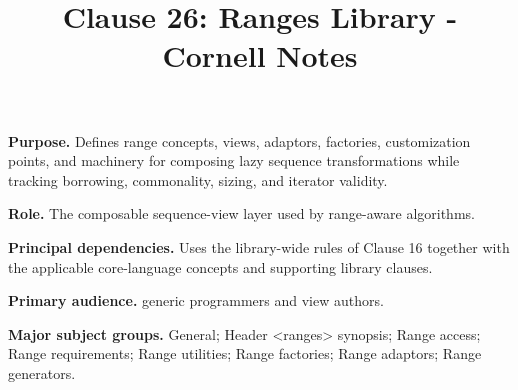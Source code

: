 \documentclass[11pt,letterpaper]{article}
\title{Clause 26: Ranges Library - Cornell Notes}
\author{}
\date{}
\begin{document}
\maketitle
\begin{CornellReferenceOrientationBox}
\textbf{Purpose.} Defines range concepts, views, adaptors, factories, customization points, and machinery for composing lazy sequence transformations while tracking borrowing, commonality, sizing, and iterator validity.
\par\textbf{Role.} The composable sequence-view layer used by range-aware algorithms.
\par\textbf{Principal dependencies.} Uses the library-wide rules of Clause 16 together with the applicable core-language concepts and supporting library clauses.
\par\textbf{Primary audience.} generic programmers and view authors.
\par\textbf{Major subject groups.} General; Header <ranges> synopsis; Range access; Range requirements; Range utilities; Range factories; Range adaptors; Range generators.
\end{CornellReferenceOrientationBox}
\end{document}

